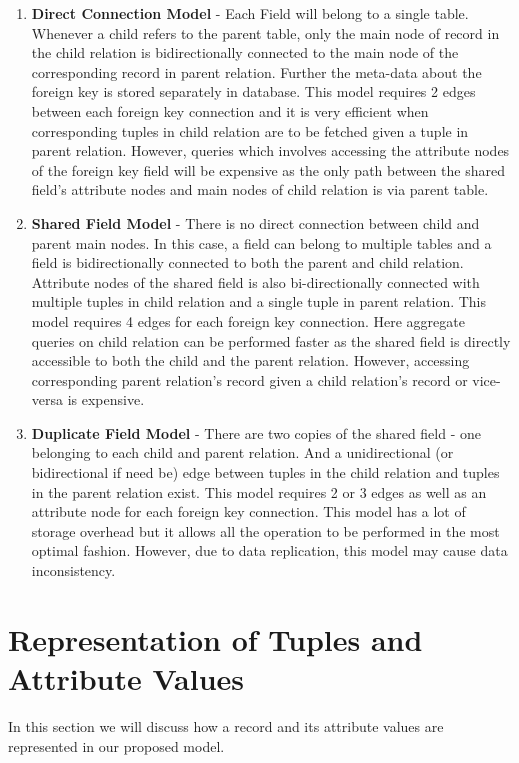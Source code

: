 \documentclass[12pt, oneside]{book}
\begin{document}
\begin{enumerate}
   \item \textbf{Direct Connection Model} - Each Field will belong to a single table. Whenever a child refers to the parent table, only the main node of record in the child relation is bidirectionally connected to the main node of the corresponding record in parent relation. Further the meta-data about the foreign key is stored separately in database. This model requires 2 edges between each foreign key connection and it is very efficient when corresponding tuples in child relation are to be fetched given a tuple in parent relation. However, queries which involves accessing the attribute nodes of the foreign key field will be expensive as the only path between the shared field's attribute nodes and main nodes of child relation is via parent table.
 \item \textbf{Shared Field Model} - There is no direct connection between child and parent main nodes. In this case, a field can belong to multiple tables and a field is bidirectionally connected to both the parent and child relation. Attribute nodes of the shared field is also bi-directionally connected with multiple tuples in child relation and a single tuple in parent relation. This model requires 4 edges for each foreign key connection. Here aggregate queries on child relation can be performed faster as the shared field is directly accessible to both the child and the parent relation. However, accessing corresponding parent relation's record given a child relation's record or vice-versa is expensive.
 \item \textbf{Duplicate Field Model} - There are two copies of the shared field - one belonging to each child and parent relation. And a unidirectional (or bidirectional if need be) edge between tuples in the child relation and tuples in the parent relation exist. This model requires 2 or 3 edges as well as an attribute node for each foreign key connection. This model has a lot of storage overhead but it allows all the operation to be performed in the most optimal fashion. However, due to data replication, this model may cause data inconsistency.
\end{enumerate}

\section{Representation of Tuples and Attribute Values}
In this section we will discuss how a record and its attribute values are represented in our proposed model.
\end{document}
